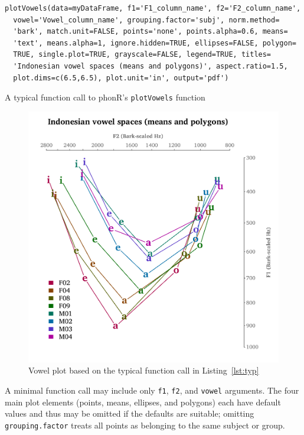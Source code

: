 \documentclass[12pt,oneside]{article}
\begin{document}
\begin{listing}[tbh]
\begin{verbatim}
plotVowels(data=myDataFrame, f1='F1_column_name', f2='F2_column_name', 
  vowel='Vowel_column_name', grouping.factor='subj', norm.method=
  'bark', match.unit=FALSE, points='none', points.alpha=0.6, means=
  'text', means.alpha=1, ignore.hidden=TRUE, ellipses=FALSE, polygon=
  TRUE, single.plot=TRUE, grayscale=FALSE, legend=TRUE, titles=
  'Indonesian vowel spaces (means and polygons)', aspect.ratio=1.5, 
  plot.dims=c(6.5,6.5), plot.unit='in', output='pdf')
\end{verbatim}
\caption{A typical function call to phonR's \texttt{plotVowels} function}
\label{lst:typ}
\end{listing}

\begin{figure}[H]
	\begin{center}
		\includegraphics[width=\textwidth]{indoOverlay.pdf}
		\caption{Vowel plot based on the typical function call in Listing~\ref{lst:typ}}
		\label{fig:indoOverlay}
	\end{center}
\end{figure}

A minimal function call may include only \texttt{f1}, \texttt{f2}, and \texttt{vowel} arguments. The four main plot elements (points, means, ellipses, and polygons) each have default values and thus may be omitted if the defaults are suitable; omitting \texttt{grouping.factor} treats all points as belonging to the same subject or group.
\end{document}
